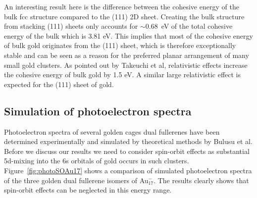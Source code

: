 An interesting result here is the difference between the cohesive energy of the
bulk fcc structure compared to the (111) 2D sheet. Creating the bulk structure
from stacking (111) sheets only accounts for $\sim$0.68~eV of the total
cohesive energy of the bulk which is 3.81
eV.\autocite{takeuchi_first-principles_1989} This implies that most of the
cohesive energy of bulk gold originates from the (111) sheet, which is
therefore exceptionally stable and can be seen as a reason for the preferred
planar arrangement of many small gold clusters.  As pointed out by Takeuchi et
al, relativistic effects increase the cohesive energy of bulk gold by 1.5
eV.\autocite{takeuchi_first-principles_1989} A similar large relativistic
effect is expected for the (111) sheet of gold.

\subsection{Simulation of photoelectron spectra}

Photoelectron spectra of several golden cages dual fullerenes have been
determined experimentally and simulated by theoretical methods by Bulusu et
al.\autocite{Bulusu_Evidencehollowgolden_2006} Before we discuss our results we
need to consider spin-orbit effects as substantial 5d-mixing into the 6s
orbitals of gold occurs in such clusters. Figure~\ref{fig:photoSOAu17} shows a
comparison of simulated photoelectron spectra of the three golden dual
fullerene isomers of Au$_{17}^-$. The results clearly shows that spin-orbit
effects can be neglected in this energy range.

